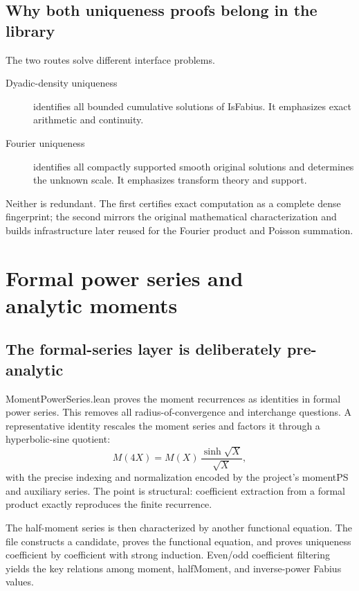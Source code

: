 \documentclass[11pt,a4paper,openany]{book}
\def\module#1{#1.lean}
\def\decl#1{#1}
\newcommand{\module}[1]{\nolinkurl{#1.lean}}
\newcommand{\decl}[1]{\texttt{\detokenize{#1}}}
\begin{document}
\section{Why both uniqueness proofs belong in the library}
The two routes solve different interface problems.
\begin{description}
\item[Dyadic-density uniqueness] identifies all bounded cumulative solutions of
\decl{IsFabius}.  It emphasizes exact arithmetic and continuity.
\item[Fourier uniqueness] identifies all compactly supported smooth original
solutions and determines the unknown scale.  It emphasizes transform theory
and support.
\end{description}
Neither is redundant.  The first certifies exact computation as a complete
dense fingerprint; the second mirrors the original mathematical
characterization and builds infrastructure later reused for the Fourier product
and Poisson summation.

\chapter[Formal power series and analytic moments]{Formal power series and\\analytic moments}
\label{ch:moments}

\section{The formal-series layer is deliberately pre-analytic}
\module{MomentPowerSeries} proves the moment recurrences as identities in
formal power series.  This removes all radius-of-convergence and interchange
questions.  A representative identity rescales the moment series and factors
it through a hyperbolic-sine quotient:
\[
 M(4X)=M(X)\,\frac{\sinh\sqrt{X}}{\sqrt{X}},
\]
with the precise indexing and normalization encoded by the project's
\decl{momentPS} and auxiliary series.  The point is structural: coefficient
extraction from a formal product exactly reproduces the finite recurrence.

The half-moment series is then characterized by another functional equation.
The file constructs a candidate, proves the functional equation, and proves
uniqueness coefficient by coefficient with strong induction.  Even/odd
coefficient filtering yields the key relations among \decl{moment},
\decl{halfMoment}, and inverse-power Fabius values.
\end{document}
